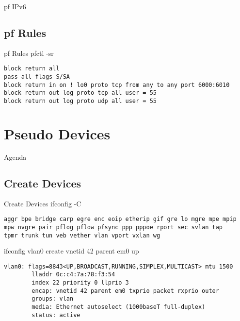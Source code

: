 \documentclass[14pt]{beamer}
\begin{document}
\begin{frame}{pf IPv6}
\begin{framed}
\end{framed}
\end{frame}

\subsection{pf Rules}
\begin{frame}[fragile]{pf Rules}
pfctl -sr
\scriptsize
\begin{verbatim}
block return all
pass all flags S/SA
block return in on ! lo0 proto tcp from any to any port 6000:6010
block return out log proto tcp all user = 55
block return out log proto udp all user = 55
\end{verbatim}
\end{frame}

\section{Pseudo Devices}
\begin{frame}{Agenda}
\tableofcontents[currentsection]
\end{frame}

\subsection{Create Devices}
\begin{frame}[fragile]{Create Devices}
ifconfig -C
\scriptsize
\begin{verbatim}
aggr bpe bridge carp egre enc eoip etherip gif gre lo mgre mpe mpip
mpw nvgre pair pflog pflow pfsync ppp pppoe rport sec svlan tap
tpmr trunk tun veb vether vlan vport vxlan wg
\end{verbatim}
\normalsize
ifconfig vlan0 create vnetid 42 parent em0 up
\scriptsize
\begin{verbatim}
vlan0: flags=8843<UP,BROADCAST,RUNNING,SIMPLEX,MULTICAST> mtu 1500
        lladdr 0c:c4:7a:78:f3:54
        index 22 priority 0 llprio 3
        encap: vnetid 42 parent em0 txprio packet rxprio outer
        groups: vlan
        media: Ethernet autoselect (1000baseT full-duplex)
        status: active
\end{verbatim}

\end{frame}
\end{document}
